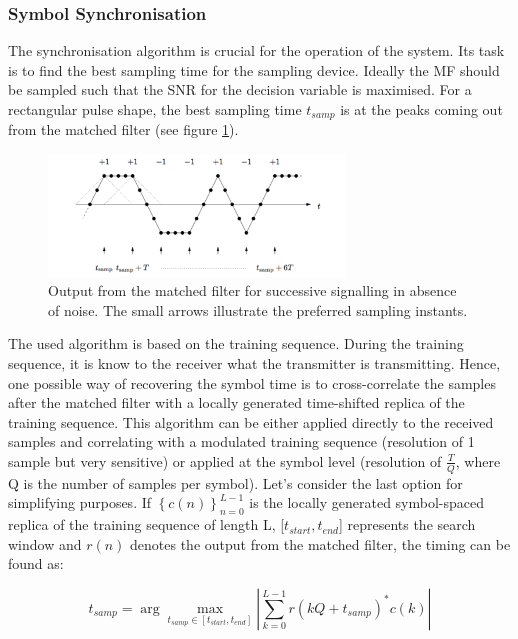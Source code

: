 \documentclass[12pt,a4paper,openright]{article}
\begin{document}
 

\subsubsection{Symbol Synchronisation}
The synchronisation algorithm is crucial for the operation of the system. Its task is to find the best sampling time for the sampling device. Ideally the MF should be sampled such that the SNR for the decision variable is maximised. For a rectangular pulse shape, the best sampling time $t_{samp}$ is at the peaks coming out from the matched filter (see figure \ref{mfpeaks}).

 \begin{figure}[h]
  \centering
    \includegraphics[width=0.7\textwidth]{mfpeaks.pdf}
    \caption{Output from the matched filter for successive signalling in absence of noise. The small arrows illustrate the preferred sampling instants.}
    \label{mfpeaks}
\end{figure}


The used algorithm is based on the training sequence. During the training sequence, it is know to the receiver what the transmitter is transmitting. Hence, one possible way of recovering the symbol time is to cross-correlate the samples after the matched filter with a locally generated time-shifted replica of the training sequence. This algorithm can be either applied directly to the received samples and correlating with a modulated training sequence (resolution of 1 sample but very sensitive) or applied at the symbol level (resolution of $\frac{T}{Q}$, where Q is the number of samples per symbol). Let's consider the last option for simplifying purposes. If ${\left\{ {c(n)} \right\}_{n = 0}^{L - 1}}$ is the locally generated symbol-spaced replica of the training sequence of length L, [$t_{start},t_{end}$] represents the search window and $r(n)$ denotes the output from the matched filter, the timing can be found as:

\[{t_{samp}} = \arg \mathop {\max }\limits_{{t_{samp}} \in [{t_{start}},{t_{end}}]} \left| {\sum\limits_{k = 0}^{L - 1} {r(kQ + {t_{samp}})^*c(k)} } \right|\]
\end{document}
